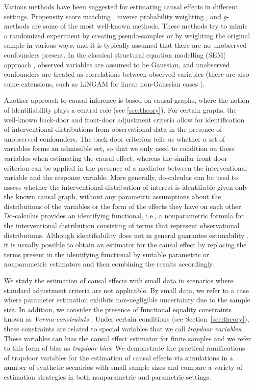 \documentclass[11pt,a4paper,twoside]{article}
\newcommand{\+}[1]{\ensuremath{\mathbf{#1}}}
\begin{document}
	Various methods have been suggested for estimating causal effects in different settings. Propensity score matching \citep{rosenbaum1983, imbens2000}, inverse probability weighting \citep{rosenbaum1983, rosenbaum1987}, and $g$-methods \citep{Robins1992} are some of the most well-known methods. These methods try to mimic a randomized experiment by creating pseudo-samples or by weighting the original sample in various ways, and it is typically assumed that there are no unobserved confounders present. In the classical structural equation modelling (SEM) approach \citep[see, e.g.,][]{Kline2011}, observed variables are assumed to be Gaussian, and unobserved confounders are treated as correlations between observed variables (there are also some extensions, such as LiNGAM for linear non-Gaussian cases \citep{shimizu2014}). 
	
	Another approach to causal inference is based on causal graphs, where the notion of identifiability plays a central role (see \autoref{sec:theory}). For certain graphs, the well-known back-door and front-door adjustment criteria \citep{Pearl1995} allow for identification of interventional distributions from observational data in the presence of unobserved confounders. The back-door criterion tells us whether a set of variables forms an admissible set, so that we only need to condition on these variables when estimating the causal effect, whereas the similar front-door criterion can be applied in the presence of a mediator between the interventional variable and the response variable. More generally, do-calculus \citep{Pearl1995} can be used to assess whether the interventional distribution of interest is identifiable given only the known causal graph, without any parametric assumptions about the distributions of the variables or the form of the effects they have on each other. Do-calculus provides an identifying functional, i.e., a nonparametric formula for the interventional distribution consisting of terms that represent observational distributions. Although identifiability does not in general guarantee estimability \citep{maclaren2019}, it is usually possible to obtain an estimator for the causal effect by replacing the terms present in the identifying functional by suitable parametric or nonparametric estimators and then combining the results accordingly. 
	
	We study the estimation of causal effects with small data in scenarios where standard adjustment criteria are not applicable. By small data, we refer to a case where parameter estimation exhibits non-negligible uncertainty due to the sample size. In addition, we consider the presence of functional equality constraints known as \emph{Verma-constraints} \citep{verma1990,TianPearl2002,robins1986}. Under certain conditions (see Section~\ref{sec:theory}), these constraints are related to special variables that we call \emph{trapdoor variables}. These variables can bias the causal effect estimator for finite samples and we refer to this form of bias as \emph{trapdoor bias}. We demonstrate the practical ramifications of trapdoor variables for the estimation of causal effects via simulations in a number of synthetic scenarios with small sample sizes and compare a variety of estimation strategies in both nonparametric and parametric settings. 
\end{document}
